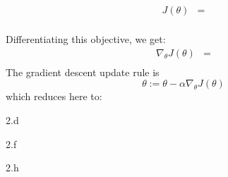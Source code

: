 \begin{answer}
  
  \begin{align*}
      J(\theta)&=\\
  \end{align*}

  Differentiating this objective, we get:
  \begin{align*}
      \nabla_{\theta} J(\theta)&=\\
  \end{align*}
  The gradient descent update rule is
  \begin{equation*}
  \theta := \theta - \alpha \nabla_{\theta} J(\theta)
  \end{equation*}
  which reduces here to:
\end{answer}
\clearpage

\LARGE
2.d
\normalsize

\begin{answer}
\end{answer}
\clearpage

\LARGE
2.f
\normalsize

\begin{answer}
\end{answer}
\clearpage

\LARGE
2.h
\normalsize

\begin{answer}
\end{answer}
\clearpage


